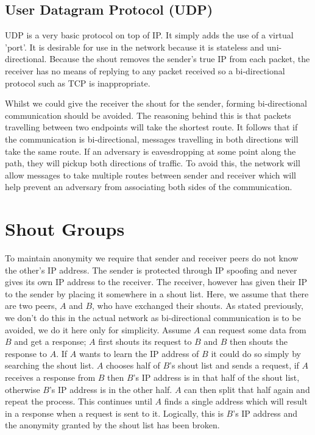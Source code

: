 \documentclass[ %
                    author={Luke Murray},
                supervisor={Dr. Simon Hollis},
                     title={Shadow Peer-to-Peer Networks},
                  subtitle={},
                    degree={MEng},
                      year={2013} ]{thesis}
\begin{document}
\subsection{User Datagram Protocol (UDP)}

UDP is a very basic protocol on top of IP. It simply adds the use of a virtual 'port'. It is desirable for use in the network because it is stateless and uni-directional. Because the shout removes the sender's true IP from each packet, the receiver has no means of replying to any packet received so a bi-directional protocol such as TCP is inappropriate.

Whilst we could give the receiver the shout for the sender, forming bi-directional communication should be avoided. The reasoning behind this is that packets travelling between two endpoints will take the shortest route. It follows that if the communication is bi-directional, messages travelling in both directions will take the same route. If an adversary is eavesdropping at some point along the path, they will pickup both directions of traffic. To avoid this, the network will allow messages to take multiple routes between sender and receiver which will help prevent an adversary from associating both sides of the communication.

\section{Shout Groups}
\label{sec:shout_groups}

To maintain anonymity we require that sender and receiver peers do not know the other's IP address. The sender is protected through IP spoofing and never gives its own IP address to the receiver. The receiver, however has given their IP to the sender by placing it somewhere in a shout list. Here, we assume that there are two peers, $A$ and $B$, who have exchanged their shouts. As stated previously, we don't do this in the actual network as bi-directional communication is to be avoided, we do it here only for simplicity. Assume $A$ can request some data from $B$ and get a response; $A$ first shouts its request to $B$ and $B$ then shouts the response to $A$. If $A$ wants to learn the IP address of $B$ it could do so simply by searching the shout list. $A$ chooses half of $B$'s shout list and sends a request, if $A$ receives a response from $B$ then $B$'s IP address is in that half of the shout list, otherwise $B$'s IP address is in the other half. $A$ can then split that half again and repeat the process. This continues until $A$ finds a single address which will result in a response when a request is sent to it. Logically, this is $B$'s IP address and the anonymity granted by the shout list has been broken.
\end{document}
